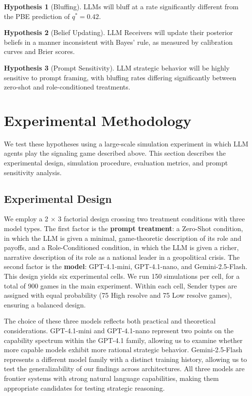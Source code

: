 \documentclass[12pt]{article}
\theoremstyle{plain}
\theoremstyle{definition}
\newtheorem{hypothesis}{Hypothesis}
\begin{document}
\begin{hypothesis}[Bluffing]
LLMs will bluff at a rate significantly different from the PBE prediction of $q^* = 0.42$.
\end{hypothesis}

\begin{hypothesis}[Belief Updating]
LLM Receivers will update their posterior beliefs in a manner inconsistent with Bayes' rule, as measured by calibration curves and Brier scores.
\end{hypothesis}

\begin{hypothesis}[Prompt Sensitivity]
LLM strategic behavior will be highly sensitive to prompt framing, with bluffing rates differing significantly between zero-shot and role-conditioned treatments.
\end{hypothesis}

\section{Experimental Methodology}

We test these hypotheses using a large-scale simulation experiment in which LLM agents play the signaling game described above. This section describes the experimental design, simulation procedure, evaluation metrics, and prompt sensitivity analysis.

\subsection{Experimental Design}

We employ a 2 $\times$ 3 factorial design crossing two treatment conditions with three model types. The first factor is the \textbf{prompt treatment}: a Zero-Shot condition, in which the LLM is given a minimal, game-theoretic description of its role and payoffs, and a Role-Conditioned condition, in which the LLM is given a richer, narrative description of its role as a national leader in a geopolitical crisis. The second factor is the \textbf{model}: GPT-4.1-mini, GPT-4.1-nano, and Gemini-2.5-Flash. This design yields six experimental cells. We run 150 simulations per cell, for a total of 900 games in the main experiment. Within each cell, Sender types are assigned with equal probability (75 High resolve and 75 Low resolve games), ensuring a balanced design.

The choice of these three models reflects both practical and theoretical considerations. GPT-4.1-mini and GPT-4.1-nano represent two points on the capability spectrum within the GPT-4.1 family, allowing us to examine whether more capable models exhibit more rational strategic behavior. Gemini-2.5-Flash represents a different model family with a distinct training history, allowing us to test the generalizability of our findings across architectures. All three models are frontier systems with strong natural language capabilities, making them appropriate candidates for testing strategic reasoning.
\end{document}
